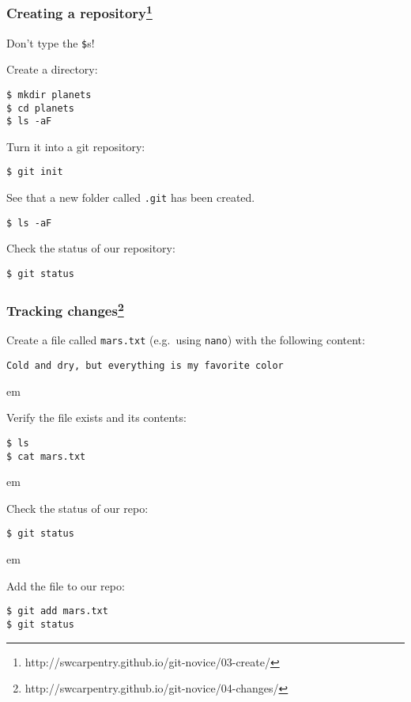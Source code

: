 \documentclass{beamer}
\begin{document}
\begin{frame}[fragile]
\frametitle{Creating a repository\footnote{http://swcarpentry.github.io/git-novice/03-create/}}

\textcolor{red!50!black}{Don't type the \texttt{\$}s!}

Create a directory:
\begin{verbatim}
$ mkdir planets
$ cd planets
$ ls -aF
\end{verbatim}

\pause
Turn it into a git repository:
\begin{verbatim}
$ git init
\end{verbatim}
\pause

See that a new folder called \texttt{.git} has been created.
\begin{verbatim}
$ ls -aF
\end{verbatim}
\pause

Check the status of our repository:
\begin{verbatim}
$ git status
\end{verbatim}

\end{frame}

\begin{frame}[fragile]
  \frametitle{Tracking changes\footnote{http://swcarpentry.github.io/git-novice/04-changes/}}

  Create a file called \texttt{mars.txt} (e.g.~using \texttt{nano}) with the following content:

\begin{verbatim}
Cold and dry, but everything is my favorite color
\end{verbatim}

  \pause

 em

Verify the file exists and its contents:

\begin{verbatim}
$ ls
$ cat mars.txt
\end{verbatim}

\pause

 em

Check the status of our repo:
\begin{verbatim}
$ git status
\end{verbatim}

 em
\pause

Add the file to our repo:
\begin{verbatim}
$ git add mars.txt
$ git status
\end{verbatim}

\end{frame}
\end{document}

